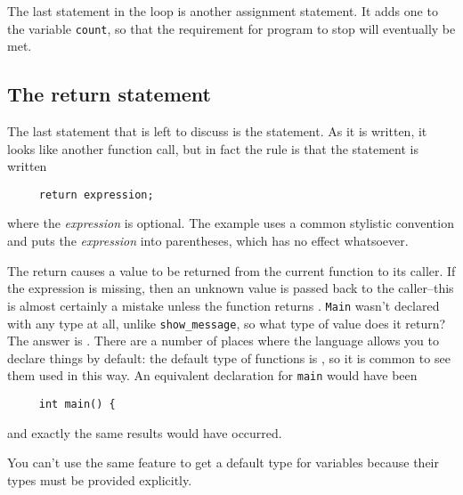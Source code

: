    The last statement in the loop is another assignment statement. It adds
    one to the variable \texttt{count}, so that the requirement for program
    to stop will eventually be met.


  

  \subsection{The return statement}
   

   The last statement that is left to discuss is the \return{}
    statement. As it is written, it looks like another function call, but in
    fact the rule is that the statement is written


   \begin{Verbatim}
     return expression;
   \end{Verbatim}

   where the \textit{expression} is optional. The example uses a common
    stylistic convention and puts the \textit{expression} into parentheses,
    which has no effect whatsoever.


   The return causes a value to be returned from the current function to its
    caller. If the expression is missing, then an unknown value is passed back
    to the caller--this is almost certainly a mistake unless the function
    returns \void. \texttt{Main} wasn't declared with any type
    at all, unlike \texttt{show\_message}, so what type of value does it
    return? The answer is \kint. There are a number of places where
    the language allows you to declare things by default: the default type of
    functions is \kint, so it is common to see them used in this
    way. An equivalent declaration for \texttt{main} would have been


   \begin{Verbatim}
     int main() {
     \end{Verbatim}

   and exactly the same results would have occurred.


   You can't use the same feature to get a default type for variables
    because their types must be provided explicitly.


